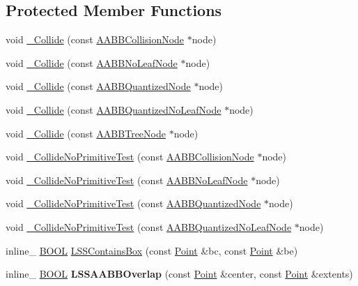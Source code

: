 \subsection*{Protected Member Functions}
\begin{DoxyCompactItemize}
\item 
void \hyperlink{class_l_s_s_collider_a74b9eb6e39c8b4859acf2d3ca081c0d4}{\+\_\+\+Collide} (const \hyperlink{class_a_a_b_b_collision_node}{A\+A\+B\+B\+Collision\+Node} $\ast$node)
\item 
void \hyperlink{class_l_s_s_collider_a9792bff52aa3bf2649985effc4d9ad70}{\+\_\+\+Collide} (const \hyperlink{class_a_a_b_b_no_leaf_node}{A\+A\+B\+B\+No\+Leaf\+Node} $\ast$node)
\item 
void \hyperlink{class_l_s_s_collider_ad825f62a1d2526c2e99a2af5914fa0a8}{\+\_\+\+Collide} (const \hyperlink{class_a_a_b_b_quantized_node}{A\+A\+B\+B\+Quantized\+Node} $\ast$node)
\item 
void \hyperlink{class_l_s_s_collider_abf5c28e72380d3c823f3dbbb235bd14d}{\+\_\+\+Collide} (const \hyperlink{class_a_a_b_b_quantized_no_leaf_node}{A\+A\+B\+B\+Quantized\+No\+Leaf\+Node} $\ast$node)
\item 
void \hyperlink{class_l_s_s_collider_a9f2c81b73391ff1cc32c0ee4c4bc7aca}{\+\_\+\+Collide} (const \hyperlink{class_a_a_b_b_tree_node}{A\+A\+B\+B\+Tree\+Node} $\ast$node)
\item 
void \hyperlink{class_l_s_s_collider_a1bf5401f4728c864a6b147d72b29dcc7}{\+\_\+\+Collide\+No\+Primitive\+Test} (const \hyperlink{class_a_a_b_b_collision_node}{A\+A\+B\+B\+Collision\+Node} $\ast$node)
\item 
void \hyperlink{class_l_s_s_collider_ab262f0ff938684510baddd1974867e90}{\+\_\+\+Collide\+No\+Primitive\+Test} (const \hyperlink{class_a_a_b_b_no_leaf_node}{A\+A\+B\+B\+No\+Leaf\+Node} $\ast$node)
\item 
void \hyperlink{class_l_s_s_collider_a8bb347360fc20fe78652713c039da096}{\+\_\+\+Collide\+No\+Primitive\+Test} (const \hyperlink{class_a_a_b_b_quantized_node}{A\+A\+B\+B\+Quantized\+Node} $\ast$node)
\item 
void \hyperlink{class_l_s_s_collider_a056188eaa9ebd253545261b848c85178}{\+\_\+\+Collide\+No\+Primitive\+Test} (const \hyperlink{class_a_a_b_b_quantized_no_leaf_node}{A\+A\+B\+B\+Quantized\+No\+Leaf\+Node} $\ast$node)
\item 
inline\+\_\+ \hyperlink{_ice_types_8h_a050c65e107f0c828f856a231f4b4e788}{B\+O\+O\+L} \hyperlink{class_l_s_s_collider_a7489e3b756284f01843ac34e52e76a09}{L\+S\+S\+Contains\+Box} (const \hyperlink{class_point}{Point} \&bc, const \hyperlink{class_point}{Point} \&be)
\item 
\hypertarget{class_l_s_s_collider_a862cb88eec58fe3b0341587ce542b443}{inline\+\_\+ \hyperlink{_ice_types_8h_a050c65e107f0c828f856a231f4b4e788}{B\+O\+O\+L} {\bfseries L\+S\+S\+A\+A\+B\+B\+Overlap} (const \hyperlink{class_point}{Point} \&center, const \hyperlink{class_point}{Point} \&extents)}\label{class_l_s_s_collider_a862cb88eec58fe3b0341587ce542b443}


\end{DoxyCompactItemize}
